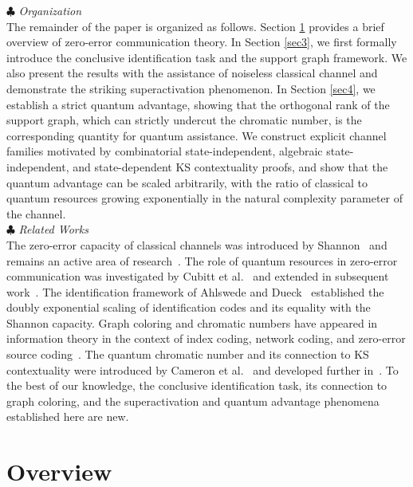 \documentclass[12pt,a4paper]{article}
\begin{document}
\noindent$\clubsuit$ {\it Organization}\vspace{-.25cm}\\

\noindent The remainder of the paper is organized as follows. Section \ref{sec2} provides a brief overview of zero-error communication theory. In Section \ref{sec3}, we first formally introduce the conclusive identification task and the support graph framework. We also present the results with the assistance of noiseless classical channel and demonstrate the striking superactivation phenomenon. 
In Section \ref{sec4}, we establish a strict quantum advantage, showing that the orthogonal rank of the support graph, which can strictly undercut the chromatic number, is the corresponding quantity for quantum assistance. We construct explicit channel families motivated by combinatorial state-independent, algebraic state-independent, and state-dependent KS contextuality proofs, and show that the quantum advantage can be scaled arbitrarily, with the ratio of classical to quantum resources growing exponentially in the natural complexity parameter of the channel.\\

\noindent$\clubsuit$ {\it Related Works}\vspace{-.25cm}\\

\noindent The zero-error capacity of classical channels was introduced by Shannon~\cite{Shannon1956} and remains an active area of research~\cite{Lovasz1979,Haemers1979}. The role of quantum resources in zero-error communication was investigated by Cubitt et al.~\cite{Cubitt2010} and extended in subsequent work~\cite{Leung2012}. The identification framework of Ahlswede and Dueck~\cite{Ahlswede1989-1} established the doubly exponential scaling of identification codes and its equality with the Shannon capacity. Graph coloring and chromatic numbers have appeared in information theory in the context of index coding, network coding, and zero-error source coding~\cite{Witsenhausen1976,Korner1988,BarYossef2006,Effros2015,Zuiddam2019}. The quantum chromatic number and its connection to KS contextuality were introduced by Cameron et al.~\cite{Cameron2007} and developed further in~\cite{Paulsen2016}. To the best of our knowledge, the conclusive identification task, its connection to graph coloring, and the superactivation and quantum advantage phenomena established here are new.




\section{Overview}\label{sec2}
\end{document}
